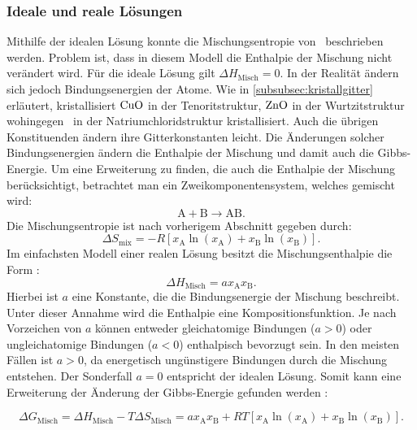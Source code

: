 \subsubsection{Ideale und reale Lösungen}
Mithilfe der idealen Lösung konnte die Mischungsentropie von \heo\ beschrieben werden.
Problem ist, dass in diesem Modell die Enthalpie der Mischung nicht verändert wird.
Für die ideale Lösung gilt $\Delta H_\mathrm{Misch} = 0$.
In der Realität ändern sich jedoch Bindungsenergien der Atome.
Wie in \cref{subsubsec:kristallgitter} erläutert, kristallisiert $\ce{CuO}$ in der Tenoritstruktur, $\ce{ZnO}$ in der
Wurtzitstruktur wohingegen \heo\ in der Natriumchloridstruktur kristallisiert.
Auch die übrigen Konstituenden ändern ihre Gitterkonstanten leicht.
Die Änderungen solcher Bindungsenergien ändern die Enthalpie der Mischung und damit auch die Gibbs-Energie.
Um eine Erweiterung zu finden, die auch die Enthalpie der Mischung berücksichtigt, betrachtet man ein
Zweikomponentensystem, welches gemischt wird:
\begin{equation}
    \mathrm{A} + \mathrm{B} \longrightarrow \mathrm{AB}.
    \label{eq:reaktion}
\end{equation}
Die Mischungsentropie ist nach vorherigem Abschnitt gegeben durch:
\begin{equation}
    \Delta S_{\mathrm{mix}}=-R[x_{\mathrm{A}}\ln(x_{\mathrm{A}})+x_{\mathrm{B}}\ln(x_{\mathrm{B}})].
    \label{eq:Mischungsentropie3}
\end{equation}
Im einfachsten Modell einer realen Lösung besitzt die Mischungsenthalpie die Form \autocite{rost_phd}:
\begin{equation}
    \Delta H_{\mathrm{Misch}}= a x_{\mathrm{A}} x_{\mathrm{B}}.
    \label{eq:Mischungsenthalpie}
\end{equation}
Hierbei ist $a$ eine Konstante, die die Bindungsenergie der Mischung beschreibt.
Unter dieser Annahme wird die Enthalpie eine Kompositionsfunktion.
Je nach Vorzeichen von $a$ können entweder gleichatomige Bindungen ($a > 0$) oder ungleichatomige Bindungen
($a < 0$) enthalpisch bevorzugt sein.
In den meisten Fällen ist $a > 0$, da energetisch ungünstigere Bindungen durch die Mischung entstehen.
Der Sonderfall $a=0$ entspricht der idealen Lösung.
Somit kann eine Erweiterung der Änderung der Gibbs-Energie gefunden werden \autocite{rost_phd}:

\begin{equation}
    \Delta G_{\mathrm{Misch}}=\Delta H_{\mathrm{Misch}}-T\Delta S_{\mathrm{Misch}}=a x_{\mathrm{A}} x_{\mathrm{B}}
    +RT[x_{\mathrm{A}}\ln(x_{\mathrm{A}})+x_{\mathrm{B}}\ln(x_{\mathrm{B}})].
    \label{eq:mischgibbs}
\end{equation}

